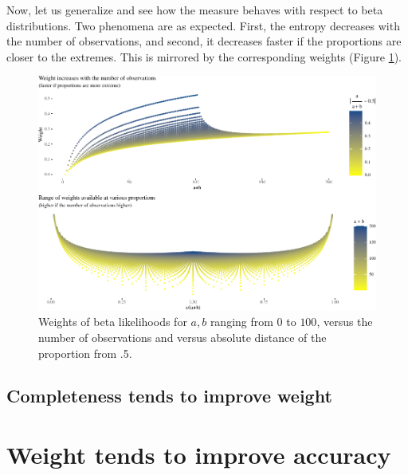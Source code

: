 \documentclass[
  10pt,
  dvipsnames,enabledeprecatedfontcommands]{scrartcl}
\begin{document}

Now, let us generalize and see how the measure behaves with respect to
beta distributions. Two phenomena are as expected. First, the entropy
decreases with the number of observations, and second, it decreases
faster if the proportions are closer to the extremes. This is mirrored
by the corresponding weights (Figure \ref{fig:weights}).

\begin{figure}[H]

\begin{center}\includegraphics[width=1\linewidth]{imprecision_weight_files/figure-latex/fig:weights-1} \end{center}
\caption{Weights of beta likelihoods for $a,b$ ranging from $0$ to $100$, versus the number of observations   and versus absolute distance of the proportion from .5.}
\label{fig:weights}
\end{figure}


\hypertarget{completeness-tends-to-improve-weight}{%
\subsection{Completeness tends to improve
weight}\label{completeness-tends-to-improve-weight}}

\hypertarget{weight-tends-to-improve-accuracy}{%
\section{Weight tends to improve
accuracy}\label{weight-tends-to-improve-accuracy}}
\end{document}
